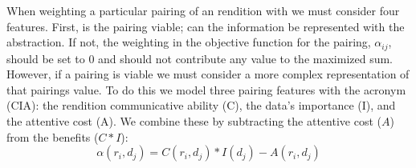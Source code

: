 \item[Weighting Information-Rendition Pairings]
When weighting a particular pairing of an rendition with we must consider four features. First, is the pairing viable; can the information be represented with the abstraction. If not, the weighting in the objective function for the pairing, $\alpha_{ij}$, should be set to 0 and should not contribute any value to the maximized sum. However, if a pairing is viable we must consider a more complex representation of that pairings value. To do this we model three pairing features with the acronym (CIA): the rendition communicative ability (C), the data's importance (I), and the  attentive cost (A). We combine these by subtracting the attentive cost ($A$)  from the benefits ($C*I$): 
\begin{equation}
\label{eq::CIA}
\alpha(r_i, d_j) = C(r_i, d_j)*I(d_j)-A(r_i, d_j)
\end{equation}

